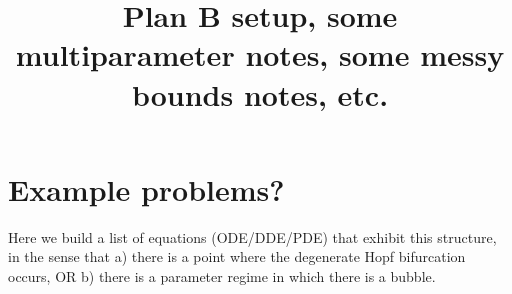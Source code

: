\documentclass[10pt]{article}
\begin{document}
\title{Plan B setup, some multiparameter notes, some messy bounds notes, etc.}
\maketitle

\section{Example problems?}
Here we build a list of equations (ODE/DDE/PDE) that exhibit this structure, in the sense that a) there is a point where the degenerate Hopf bifurcation occurs, OR b) there is a parameter regime in which there is a bubble.
\end{document}
